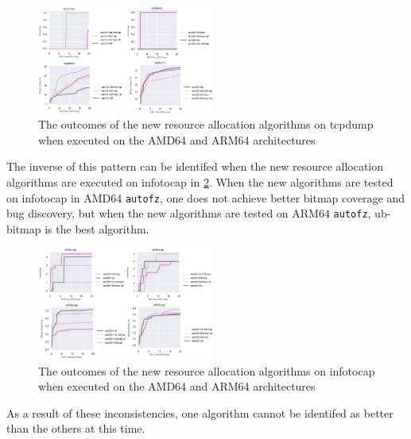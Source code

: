 \begin{figure}
    \includegraphics[width=0.52\textwidth]{figs/tcpdump_algo_compare.png}
    \centering
    \caption{The outcomes of the new resource allocation algorithms on tcpdump when executed on the AMD64 and ARM64 architectures}
    \label{figs:tcpdump_algo_compare.png}
\end{figure}

The inverse of this pattern can be identifed when the new resource allocation algorithms are executed on infotocap in 
\ref{figs:infotocap_algo_compare.png}. When the new algorithms are tested on infotocap in AMD64 \texttt{autofz}, one does not achieve better
bitmap coverage and bug discovery, but when the new algorithms are tested on ARM64 \texttt{autofz}, ub-bitmap is the best algorithm.

\begin{figure}

    \includegraphics[width=0.52\textwidth]{figs/infotocap_algo_compare.png}
    \centering
    \caption{The outcomes of the new resource allocation algorithms on infotocap when executed on the AMD64 and ARM64 architectures}
    \label{figs:infotocap_algo_compare.png}
\end{figure}

As a result of these inconsistencies, one algorithm cannot be identifed as better than the others at this time.


